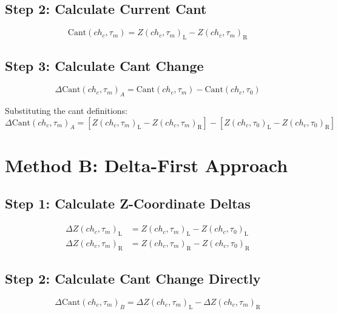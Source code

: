 \documentclass{article}
\newcommand{\chainage}[1]{ch_{#1}}
\newcommand{\time}[1]{\tau_{#1}}
\newcommand{\Left}{\text{L}}
\newcommand{\Right}{\text{R}}
\newcommand{\Z}[3]{Z(#1, #2)_{#3}}
\newcommand{\DZ}[3]{\Delta Z(#1, #2)_{#3}}
\newcommand{\Cant}[2]{\text{Cant}(#1, #2)}
\newcommand{\DCant}[2]{\Delta\text{Cant}(#1, #2)}
\begin{document}
\subsection{Step 2: Calculate Current Cant}
\begin{equation}
\Cant{\chainage{c}}{\time{m}} = \Z{\chainage{c}}{\time{m}}{\Left} - \Z{\chainage{c}}{\time{m}}{\Right}
\end{equation}

\subsection{Step 3: Calculate Cant Change}
\begin{equation}
\DCant{\chainage{c}}{\time{m}}_A = \Cant{\chainage{c}}{\time{m}} - \Cant{\chainage{c}}{\time{0}}
\end{equation}

Substituting the cant definitions:
\begin{equation}
\DCant{\chainage{c}}{\time{m}}_A = \left[\Z{\chainage{c}}{\time{m}}{\Left} - \Z{\chainage{c}}{\time{m}}{\Right}\right] - \left[\Z{\chainage{c}}{\time{0}}{\Left} - \Z{\chainage{c}}{\time{0}}{\Right}\right]
\end{equation}

\section{Method B: Delta-First Approach}

\subsection{Step 1: Calculate Z-Coordinate Deltas}
\begin{align}
\DZ{\chainage{c}}{\time{m}}{\Left} &= \Z{\chainage{c}}{\time{m}}{\Left} - \Z{\chainage{c}}{\time{0}}{\Left} \\
\DZ{\chainage{c}}{\time{m}}{\Right} &= \Z{\chainage{c}}{\time{m}}{\Right} - \Z{\chainage{c}}{\time{0}}{\Right}
\end{align}

\subsection{Step 2: Calculate Cant Change Directly}
\begin{equation}
\DCant{\chainage{c}}{\time{m}}_B = \DZ{\chainage{c}}{\time{m}}{\Left} - \DZ{\chainage{c}}{\time{m}}{\Right}
\end{equation}
\end{document}

